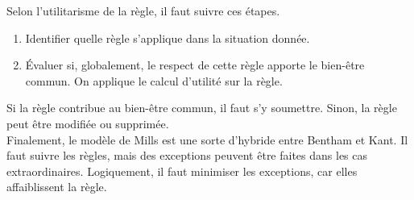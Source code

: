 \documentclass[11pt]{article}
\begin{document}
Selon l'utilitarisme de la règle, il faut suivre ces étapes.
\begin{enumerate}
\item Identifier quelle règle s'applique dans la situation donnée.
\item Évaluer si, globalement, le respect de cette règle apporte le bien-être commun. On applique le calcul d'utilité sur la règle.
\end{enumerate}

Si la règle contribue au bien-être commun, il faut s'y soumettre. Sinon, la règle peut être modifiée ou supprimée.\\

Finalement, le modèle de Mills est une sorte d'hybride entre Bentham et Kant. Il faut suivre les règles, mais des exceptions peuvent être faites dans les cas extraordinaires. Logiquement, il faut minimiser les exceptions, car elles affaiblissent la règle.
\end{document}
